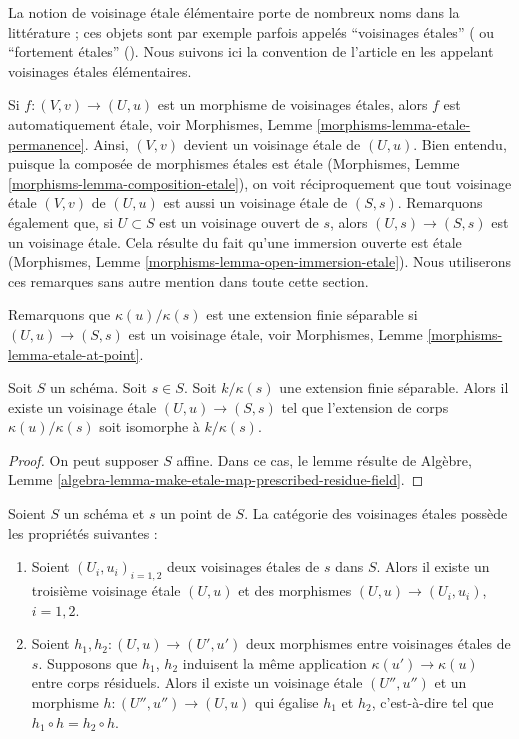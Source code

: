 \noindent
La notion de voisinage \'etale élémentaire porte de nombreux noms
dans la littérature ; ces objets sont par exemple parfois appelés
``voisinages \'etales'' (\cite[Page 36]{Milne} ou
``fortement \'etales'' (\cite[Page 108]{KPR}).
Nous suivons ici la convention de l'article
\cite{GruRay} en les appelant voisinages \'etales élémentaires.

\medskip\noindent
Si $f : (V, v) \to (U, u)$ est un morphisme de voisinages \'etales,
alors $f$ est automatiquement \'etale, voir
Morphismes, Lemme \ref{morphisms-lemma-etale-permanence}.
Ainsi, $(V, v)$ devient un voisinage \'etale de
$(U, u)$. Bien entendu, puisque la composée de morphismes \'etales
est \'etale (Morphismes, Lemme \ref{morphisms-lemma-composition-etale}),
on voit réciproquement que tout voisinage \'etale $(V, v)$ de
$(U, u)$ est aussi un voisinage \'etale de $(S, s)$.
Remarquons également que, si $U \subset S$ est un voisinage ouvert
de $s$, alors $(U, s) \to (S, s)$ est un voisinage \'etale.
Cela résulte du fait qu'une immersion ouverte est
\'etale (Morphismes, Lemme \ref{morphisms-lemma-open-immersion-etale}).
Nous utiliserons ces remarques sans autre mention dans toute cette
section.

\medskip\noindent
Remarquons que $\kappa(u)/\kappa(s)$ est une extension finie séparable
si $(U, u) \to (S, s)$ est un voisinage \'etale,
voir Morphismes, Lemme \ref{morphisms-lemma-etale-at-point}.

\begin{lemma}
\label{lemma-realize-prescribed-residue-field-extension-etale}
Soit $S$ un schéma.
Soit $s \in S$.
Soit $k/\kappa(s)$ une extension finie séparable.
Alors il existe un voisinage \'etale $(U, u) \to (S, s)$
tel que l'extension de corps $\kappa(u)/\kappa(s)$ soit
isomorphe à $k/\kappa(s)$.
\end{lemma}

\begin{proof}
On peut supposer $S$ affine.
Dans ce cas, le lemme résulte de
Algèbre, Lemme \ref{algebra-lemma-make-etale-map-prescribed-residue-field}.
\end{proof}

\begin{lemma}
\label{lemma-etale-neighbourhoods-not-quite-filtered}
Soient $S$ un schéma et $s$ un point de $S$.
La catégorie des voisinages \'etales possède les propriétés suivantes :
\begin{enumerate}
\item Soient $(U_i, u_i)_{i=1, 2}$ deux voisinages \'etales de
$s$ dans $S$. Alors il existe un troisième voisinage \'etale
$(U, u)$ et des morphismes
$(U, u) \to (U_i, u_i)$, $i = 1, 2$.
\item Soient $h_1, h_2: (U, u) \to (U', u')$ deux
morphismes entre voisinages \'etales de $s$.
Supposons que $h_1$, $h_2$ induisent la même application $\kappa(u') \to \kappa(u)$ entre corps
résiduels. Alors il existe un voisinage \'etale $(U'', u'')$ et un morphisme
$h : (U'', u'') \to (U, u)$
qui égalise $h_1$ et $h_2$, c'est-à-dire tel que
$h_1 \circ h = h_2 \circ h$.
\end{enumerate}
\end{lemma}

